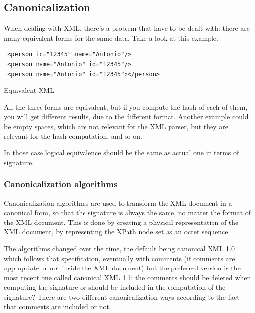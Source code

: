 \subsection{Canonicalization}
When dealing with XML, there's a problem that have to be dealt with: 
there are many equivalent forms for the same data. Take a look at this
example:
\begin{listing}[H]
  \centering
  \begin{verbatim}
 <person id="12345" name="Antonio"/>
 <person name="Antonio" id="12345"/>
 <person name="Antonio" id="12345"></person>
  \end{verbatim}
  \caption{Equivalent XML}
\end{listing}
All the three forms are equivalent, but if you compute the hash of
each of them, you will get different results, due to the different 
format. Another example could be empty spaces, which are not relevant 
for the XML parser, but they are relevant for the hash computation,
and so on.

In those case logical equivalence should be the same as actual one in
terms of signature.

\subsubsection{Canonicalization algorithms}

Canonicalization algorithms are used to transform the XML document in 
a canonical form, so that the signature is always the same, no matter 
the format of the XML document.  This is done by creating a physical 
representation of the XML document, by representing the XPath node set 
as an octet sequence.

The algorithms changed over the time, the default being canonical XML
1.0 which follows that specification, eventually with comments (if
comments are appropriate or not inside the XML document) but the
preferred version is the most recent one called canonical XML 1.1:
the comments should be deleted when computing the signature or should
be included in the computation of the signature? There are two
different canonicalization ways according to the fact that comments
are included or not.

